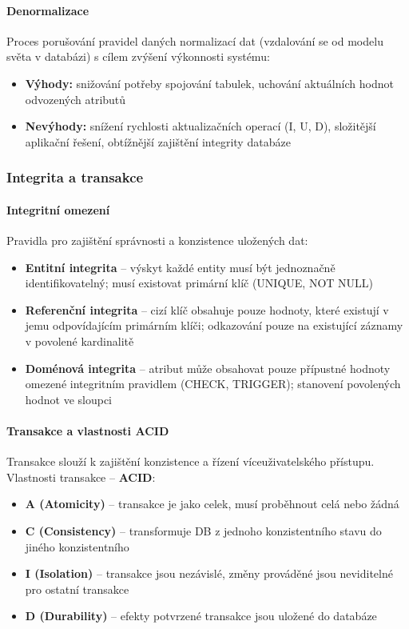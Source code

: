 \documentclass[12pt,a4paper]{article}
\begin{document}
\paragraph{Denormalizace}
Proces porušování pravidel daných normalizací dat (vzdalování se od modelu světa v databázi) s cílem
zvýšení výkonnosti systému:
\begin{itemize}
  \item \textbf{Výhody:} snižování potřeby spojování tabulek, uchování aktuálních hodnot odvozených atributů
  \item \textbf{Nevýhody:} snížení rychlosti aktualizačních operací (I, U, D), složitější aplikační řešení,
    obtížnější zajištění integrity databáze
\end{itemize}

\subsubsection{Integrita a transakce}

\paragraph{Integritní omezení}
Pravidla pro zajištění správnosti a konzistence uložených dat:
\begin{itemize}
  \item \textbf{Entitní integrita} -- výskyt každé entity musí být jednoznačně identifikovatelný;
    musí existovat primární klíč (UNIQUE, NOT NULL)
  \item \textbf{Referenční integrita} -- cizí klíč obsahuje pouze hodnoty, které existují v jemu
    odpovídajícím primárním klíči; odkazování pouze na existující záznamy v povolené kardinalitě
  \item \textbf{Doménová integrita} -- atribut může obsahovat pouze přípustné hodnoty omezené
    integritním pravidlem (CHECK, TRIGGER); stanovení povolených hodnot ve sloupci
\end{itemize}

\paragraph{Transakce a vlastnosti ACID}
Transakce slouží k zajištění konzistence a řízení víceuživatelského přístupu.
Vlastnosti transakce -- \textbf{ACID}:
\begin{itemize}
  \item \textbf{A (Atomicity)} -- transakce je jako celek, musí proběhnout celá nebo žádná
  \item \textbf{C (Consistency)} -- transformuje DB z jednoho konzistentního stavu do jiného
    konzistentního
  \item \textbf{I (Isolation)} -- transakce jsou nezávislé, změny prováděné jsou neviditelné pro
    ostatní transakce
  \item \textbf{D (Durability)} -- efekty potvrzené transakce jsou uložené do databáze
\end{itemize}
\end{document}
